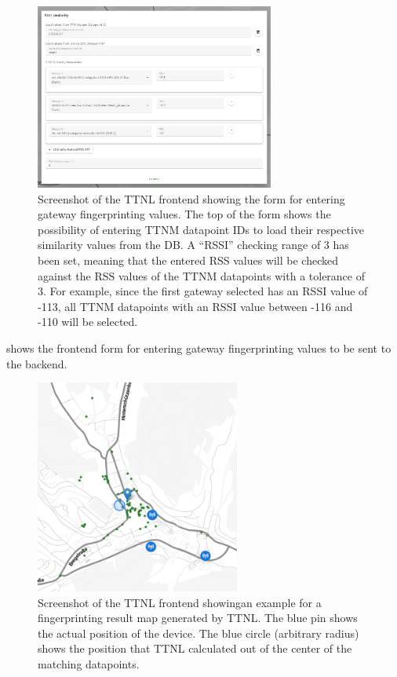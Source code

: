 \begin{figure}[htbp]
    \centering
    \includegraphics[width=0.7\textwidth]{pictures/ttn-locator/frontend/rssi_similarity_form.png}
    \caption{
        Screenshot of the \ac{TTNL} frontend showing the form for entering gateway fingerprinting values.
        The top of the form shows the possibility of entering \ac{TTNM} datapoint IDs to load their respective similarity values from the \ac{DB}.
        A ``RSSI'' checking range of 3 has been set, meaning that the entered \ac{RSS} values will be checked against the \ac{RSS} values of the \ac{TTNM} datapoints with a tolerance of 3.
        For example, since the first gateway selected has an \ac{RSSI} value of -113, all \ac{TTNM} datapoints with an \ac{RSSI} value between -116 and -110 will be selected.
    }\label{fig:rssi-similarity-form-frontend}
\end{figure}

 shows the frontend form for entering gateway fingerprinting values to be sent to the backend.

\begin{figure}[htbp]
    \centering
    \includegraphics[width=0.6\textwidth]{pictures/ttn-locator/frontend/fingerprinting/rssi_similarity_map_example.png}
    \caption{
        Screenshot of the \ac{TTNL} frontend showingan example for a fingerprinting result map generated by \ac{TTNL}.
        The blue pin shows the actual position of the device.
        The blue circle (arbitrary radius) shows the position that \ac{TTNL} calculated out of the center of the matching datapoints.
    }\label{fig:fingerprinting-map-example-only-center}
\end{figure}

